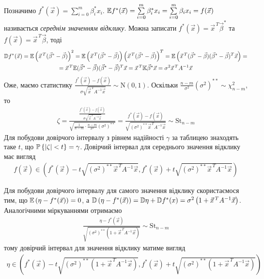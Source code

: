 Позначимо $f^*(\vec{x}) = \sum\limits_{i=0}^m \beta_i^* x_i$. 
$\E f^*(\vec{x}) = \sum\limits_{i=0}^m \beta_i^* x_i = \sum\limits_{i=0}^m \beta_i x_i = f(\vec{x})$
називається \emph{середнім значенням відклику}. Можна записати
$f^*(\vec{x}) = \vec{x}^{\, T} \vec{\beta}^*$ та $f(\vec{x}) = \vec{x}^{\, T} \vec{\beta}$, тоді
\begin{gather*}
    \D f^*(\vec{x}) = \E \left(\vec{x}^{\, T} (\vec{\beta}^* - \vec{\beta})\right)^2 = 
    \E \left(\vec{x}^{\, T} (\vec{\beta}^* - \vec{\beta})\right)\left(\vec{x}^{\, T} (\vec{\beta}^* - \vec{\beta})\right)^T = 
    \E\left(\vec{x}^{\, T} (\vec{\beta}^* - \vec{\beta}) (\vec{\beta}^* - \vec{\beta})^T \vec{x}\right) = \\
    = \vec{x}^{\, T} \E (\vec{\beta}^* - \vec{\beta}) (\vec{\beta}^* - \vec{\beta})^T \vec{x} = 
    \vec{x}^{\, T} \K\vec{\beta}^* \vec{x} = 
    \sigma^2 \vec{x}^{\, T} A^{-1} \vec{x}
\end{gather*}
Оже, маємо статистику
$
    \frac{f^*(\vec{x}) - f(\vec{x})}{\sigma \sqrt{\vec{x}^{\, T} A^{-1} \vec{x}}} \sim \mathrm{N}(0, 1)
$. Оскільки $\frac{n-m}{\sigma^2} (\sigma^2)^{**} \sim \chi^2_{n-m}$, то
\begin{gather*}
    \zeta = \frac{
        \frac{f^*(\vec{x}) - f(\vec{x})}{\sigma \sqrt{\vec{x}^{\, T} A^{-1} \vec{x}}}
    }{
        \sqrt{
            \frac{1}{n-m}\cdot \frac{n-m}{\sigma^2} (\sigma^2)^{**}
        }
    } = \frac{f^*(\vec{x}) - f(\vec{x})}{
        \sqrt{(\sigma^2)^{**} \vec{x}^{\, T} A^{-1} \vec{x}}
    } \sim \mathrm{St}_{n-m}
\end{gather*}
Для побудови довірчого інтервалу з рівнем надійності $\gamma$ за таблицею знаходять таке $t$, що
$\P\left\{|\zeta| < t \right\} = \gamma$. Довірчий інтервал для середнього значення відклику має вигляд
\begin{gather}\label{interv_1}
    f(\vec{x}) \in 
    \left(
        f^*(\vec{x}) - t \sqrt{(\sigma^2)^{**} \vec{x}^{\, T} A^{-1} \vec{x}}, 
        f^*(\vec{x}) + t \sqrt{(\sigma^2)^{**} \vec{x}^{\, T} A^{-1} \vec{x}}
    \right)
\end{gather}

Для побудови довірчого інтервалу для самого значення відклику скористаємося тим, що
$\E \left(\eta - f^*(\vec{x})\right) = 0$, а $\D\left(\eta - f^*(\vec{x})\right) = 
\D\eta + \D f^*(x) = \sigma^2 \left(1 + \vec{x}^{\, T} A^{-1} \vec{x}\right)$. Аналогічними міркуваннями отримаємо
\begin{gather*}
    \frac{\eta - f^*(\vec{x})}{
        \sqrt{(\sigma^2)^{**} \left(1 + \vec{x}^{\, T} A^{-1} \vec{x}\right)}} \sim \mathrm{St}_{n-m}
\end{gather*}
тому довірчий інтервал для значення відклику матиме вигляд
\begin{gather}\label{interv_2}
    \eta \in
    \left(
        f^*(\vec{x}) - t \sqrt{(\sigma^2)^{**} \left(1 + \vec{x}^{\, T} A^{-1} \vec{x}\right)}, 
        f^*(\vec{x}) + t \sqrt{(\sigma^2)^{**} \left(1 + \vec{x}^{\, T} A^{-1} \vec{x}\right)}
    \right)
\end{gather}

